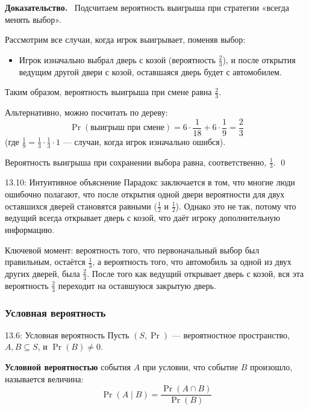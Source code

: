 \documentclass[a4paper,12pt]{article}
\newcommand{\myproof}{\textbf{Доказательство.}\ }
\begin{document}
	\myproof
	Подсчитаем вероятность выигрыша при стратегии «всегда менять выбор».
	
	Рассмотрим все случаи, когда игрок выигрывает, поменяв выбор:
	\begin{itemize}
		\item Игрок изначально выбрал дверь с козой (вероятность \(\frac{2}{3}\)), и после открытия ведущим другой двери с козой, оставшаяся дверь будет с автомобилем.
	\end{itemize}
	
	Таким образом, вероятность выигрыша при смене равна \(\frac{2}{3}\).
	
	Альтернативно, можно посчитать по дереву:
	\[ \Pr(\text{выигрыш при смене}) = 6 \cdot \frac{1}{18} + 6 \cdot \frac{1}{9} = \frac{2}{3} \]
	(где \(\frac{1}{9} = \frac{1}{3} \cdot \frac{1}{3} \cdot 1\) — случаи, когда игрок изначально ошибся).
	
	Вероятность выигрыша при сохранении выбора равна, соответственно, \(\frac{1}{3}\). \qed
	
	\begin{notebook}{13.10: Интуитивное объяснение}
		Парадокс заключается в том, что многие люди ошибочно полагают, что после открытия одной двери вероятности для двух оставшихся дверей становятся равными (\(\frac{1}{2}\) и \(\frac{1}{2}\)). Однако это не так, потому что ведущий всегда открывает дверь с козой, что даёт игроку дополнительную информацию.
		
		Ключевой момент: вероятность того, что первоначальный выбор был правильным, остаётся \(\frac{1}{3}\), а вероятность того, что автомобиль за одной из двух других дверей, была \(\frac{2}{3}\). После того как ведущий открывает дверь с козой, вся эта вероятность \(\frac{2}{3}\) переходит на оставшуюся закрытую дверь.
	\end{notebook}
	
	
	\subsubsection{Условная вероятность}
	
	\begin{definitionbox}{13.6: Условная вероятность}
		Пусть \((S, \Pr)\) — вероятностное пространство, \(A, B \subseteq S\), и \(\Pr(B) \neq 0\).
		
		\textbf{Условной вероятностью} события \(A\) при условии, что событие \(B\) произошло, называется величина:
		\[ \Pr(A \mid B) = \frac{\Pr(A \cap B)}{\Pr(B)} \]
	\end{definitionbox}
	
\end{document}
